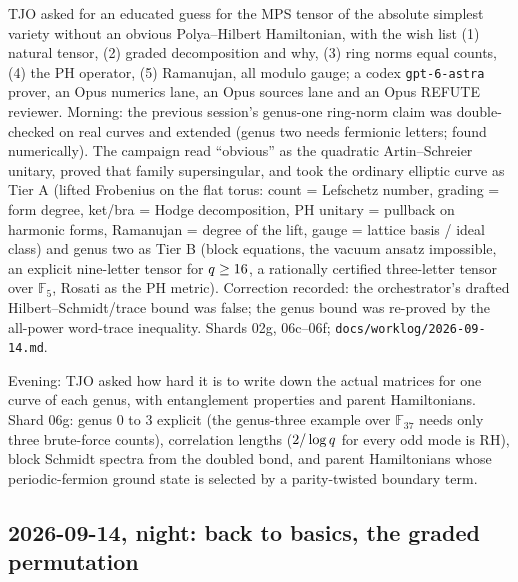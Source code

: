TJO asked for an educated guess for the MPS tensor of the absolute simplest variety without
an obvious Polya--Hilbert Hamiltonian, with the wish list (1) natural tensor, (2) graded
decomposition and why, (3) ring norms equal counts, (4) the PH operator, (5) Ramanujan, all
modulo gauge; a codex \texttt{gpt-6-astra} prover, an Opus numerics lane, an Opus sources lane and
an Opus REFUTE reviewer. Morning: the previous session's genus-one ring-norm claim was
double-checked on real curves and extended (genus two needs fermionic letters; found
numerically). The campaign read ``obvious'' as the quadratic Artin--Schreier unitary, proved
that family supersingular, and took the ordinary elliptic curve as Tier A (lifted Frobenius on
the flat torus: count = Lefschetz number, grading = form degree, ket/bra = Hodge
decomposition, PH unitary = pullback on harmonic forms, Ramanujan = degree of the lift, gauge
= lattice basis / ideal class) and genus two as Tier B (block equations, the vacuum ansatz
impossible, an explicit nine-letter tensor for $q\ge16$, a rationally certified three-letter
tensor over $\mathbb F_5$, Rosati as the PH metric). Correction recorded: the orchestrator's
drafted Hilbert--Schmidt/trace bound was false; the genus bound was re-proved by the
all-power word-trace inequality. Shards 02g, 06c--06f; \texttt{docs/worklog/2026-09-14.md}.

Evening: TJO asked how hard it is to write down the actual matrices for one curve of each
genus, with entanglement properties and parent Hamiltonians. Shard 06g: genus $0$ to $3$
explicit (the genus-three example over $\mathbb F_{37}$ needs only three brute-force counts),
correlation lengths ($2/\log q$ for every odd mode is RH), block Schmidt spectra from the
doubled bond, and parent Hamiltonians whose periodic-fermion ground state is selected by a
parity-twisted boundary term.


\subsection*{2026-09-14, night: back to basics, the graded permutation}

